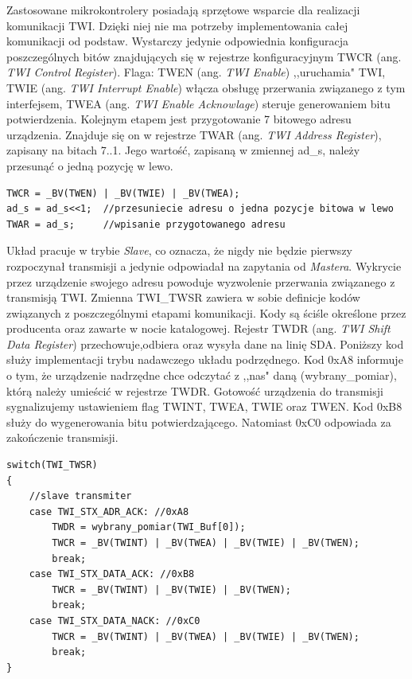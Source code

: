 Zastosowane mikrokontrolery posiadają sprzętowe wsparcie dla realizacji komunikacji TWI. Dzięki niej nie ma potrzeby implementowania całej komunikacji od podstaw. Wystarczy jedynie odpowiednia konfiguracja poszczególnych bitów znajdujących się w rejestrze konfiguracyjnym TWCR (ang. \textit{TWI Control Register})\cite{nota}. Flaga: TWEN (ang. \textit{TWI Enable}) ,,uruchamia" TWI, TWIE (ang. \textit{TWI Interrupt Enable}) włącza obsługę przerwania związanego z tym interfejsem, TWEA (ang. \textit{TWI Enable Acknowlage}) steruje generowaniem bitu potwierdzenia. Kolejnym etapem jest przygotowanie 7 bitowego adresu urządzenia. Znajduje się on w rejestrze TWAR (ang. \textit{TWI Address Register}), zapisany na bitach 7..1. Jego wartość, zapisaną w zmiennej ad\_s, należy przesunąć o jedną pozycję w lewo. 
\begin{lstlisting}[caption=Uruchomienie interfejsu TWI oraz przypisanie adresu urządzenia]
TWCR = _BV(TWEN) | _BV(TWIE) | _BV(TWEA);
ad_s = ad_s<<1;  //przesuniecie adresu o jedna pozycje bitowa w lewo
TWAR = ad_s;     //wpisanie przygotowanego adresu
\end{lstlisting}
Układ pracuje w trybie \textit{Slave}, co oznacza, że nigdy nie będzie pierwszy rozpoczynał transmisji a jedynie odpowiadał na zapytania od \textit{Mastera}. Wykrycie przez urządzenie swojego adresu powoduje wyzwolenie przerwania związanego z transmisją TWI. Zmienna TWI\_TWSR zawiera w sobie definicje kodów związanych z poszczególnymi etapami komunikacji. Kody są ściśle określone przez producenta oraz zawarte w nocie katalogowej\cite{nota}. Rejestr TWDR (ang. \textit{TWI Shift Data Register}) przechowuje,odbiera oraz wysyła dane na linię SDA. Poniższy kod służy implementacji trybu nadawczego układu podrzędnego. Kod 0xA8 informuje o tym, że urządzenie nadrzędne chce odczytać z ,,nas" daną (wybrany\_pomiar), którą należy umieścić w rejestrze TWDR. Gotowość urządzenia do transmisji sygnalizujemy ustawieniem flag TWINT, TWEA, TWIE oraz TWEN. Kod 0xB8 służy do wygenerowania bitu potwierdzającego. Natomiast 0xC0 odpowiada za zakończenie transmisji.
\begin{lstlisting}[caption={Fragment przerwania obsługującego komunikację TWI, który jest odpowiedzialny za wysłanie wskazanego bajtu}]
switch(TWI_TWSR)
{
	//slave transmiter
	case TWI_STX_ADR_ACK: //0xA8
		TWDR = wybrany_pomiar(TWI_Buf[0]);
		TWCR = _BV(TWINT) | _BV(TWEA) | _BV(TWIE) | _BV(TWEN);
		break;
	case TWI_STX_DATA_ACK: //0xB8
		TWCR = _BV(TWINT) | _BV(TWIE) | _BV(TWEN);
		break;
	case TWI_STX_DATA_NACK: //0xC0
		TWCR = _BV(TWINT) | _BV(TWEA) | _BV(TWIE) | _BV(TWEN);
		break;
}
\end{lstlisting}
